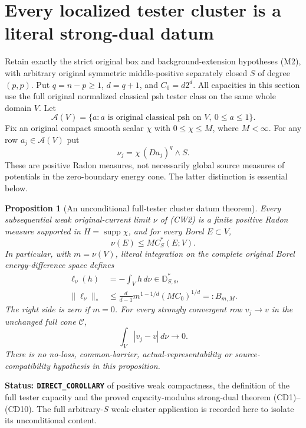 \documentclass[11pt,a4paper]{article}
\numberwithin{equation}{section}
\newtheorem{proposition}[theorem]{Proposition}
\theoremstyle{definition}
\theoremstyle{remark}
\begin{document}
\section{Every localized tester cluster is a literal strong-dual datum}
\label{sec:r12-capacity-cluster-strong-dual}

Retain exactly the strict original box and background-extension
hypotheses (M2), with arbitrary original symmetric middle-positive
separately closed $S$ of degree $(p,p)$. Put $q=n-p\geq1$,
$d=q+1$, and $C_0=d2^d$. All capacities in this section use the
full original normalized classical psh tester class on the same
whole domain $V$. Let
\[
 \mathcal A(V)=\{a: a\text{ is original classical psh on }V,
                                      \ 0\leq a\leq1\}.
 \tag{CW1}
\]
Fix an original compact smooth scalar $\chi$ with $0\leq\chi\leq M$,
where $M<\infty$. For any row $a_j\in\mathcal A(V)$ put
\[
       \nu_j=\chi\,(Da_j)^q\wedge S.
 \tag{CW2}
\]
These are positive Radon measures, not necessarily global source
measures of potentials in the zero-boundary energy cone. The latter
distinction is essential below.

\begin{proposition}[An unconditional full-tester cluster datum theorem]
\label{prop:r12-capacity-cluster-literal-dual}
Every subsequential weak original-current limit $\nu$ of (CW2)
is a finite positive Radon measure supported in
$H=\operatorname{supp}\chi$, and for every Borel $E\subset V$,
\[
                         \nu(E)\leq M C_S^*(E;V).
 \tag{CW3}
\]
In particular, with $m=\nu(V)$, literal integration on the complete
original Borel energy-difference space defines
\[
 \begin{split}
 \ell_\nu(h)&=-\int_Vh\,d\nu\in\mathbb D_{S,\mathrm s}^*,\\
 \|\ell_\nu\|_*
       &\leq \frac{d}{d-1}
                 m^{1-1/d}(M C_0)^{1/d}=:B_{m,M}.
 \end{split}
 \tag{CW4}
\]
The right side is zero if $m=0$. For every strongly convergent
row $v_j\to v$ in the unchanged full cone $\mathscr C$,
\[
                         \int_V|v_j-v|\,d\nu\longrightarrow0.
 \tag{CW5}
\]
There is no no-loss, common-barrier, actual-representability or
source-compatibility hypothesis in this proposition.
\end{proposition}

\noindent\textbf{Status: \texttt{DIRECT\_COROLLARY}} of
positive weak compactness, the definition of the full tester
capacity and the proved capacity-modulus strong-dual theorem
(CD1)--(CD10). The full arbitrary-$S$ weak-cluster application
is recorded here to isolate its unconditional content.
\end{document}
